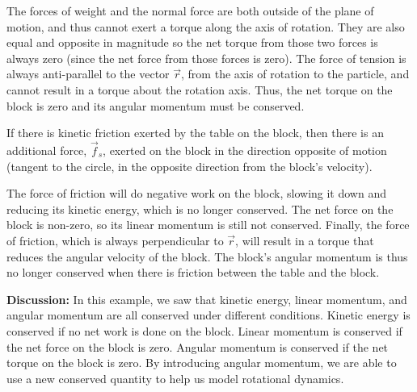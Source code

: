 \begin{framed}
\begin{framed}
The forces of weight and the normal force are both outside of the plane of motion, and thus cannot exert a torque along the axis of rotation. They are also equal and opposite in magnitude so the net torque from those two forces is always zero (since the net force from those forces is zero). The force of tension is always anti-parallel to the vector $\vec r$, from the axis of rotation to the particle, and cannot result in a torque about the rotation axis. Thus, the net torque on the block is zero and its angular momentum must be conserved.

If there is kinetic friction exerted by the table on the block, then there is an additional force, $\vec f_s$, exerted on the block in the direction opposite of motion (tangent to the circle, in the opposite direction from the block's velocity).

The force of friction will do negative work on the block, slowing it down and reducing its kinetic energy, which is no longer conserved. The net force on the block is non-zero, so its linear momentum is still not conserved. Finally, the force of friction, which is always perpendicular to $\vec r$, will result in a torque that reduces the angular velocity of the block. The block's angular momentum is thus no longer conserved when there is friction between the table and the block.

\textbf{Discussion:} In this example, we saw that kinetic energy, linear momentum, and angular momentum are all conserved under different conditions. Kinetic energy is conserved if no net work is done on the block. Linear momentum is conserved if the net force on the block is zero. Angular momentum is conserved if the net torque on the block is zero. By introducing angular momentum, we are able to use a new conserved quantity to help us model rotational dynamics.
\end{framed}
\end{framed}

